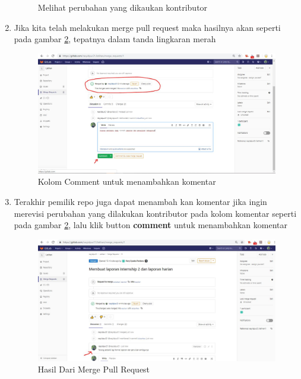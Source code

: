 \begin{enumerate}
\begin{figure}[!htbp]
\caption{Melihat perubahan yang dikaukan kontributor}
\label{fig:pr9}
\end{figure}
\item Jika kita telah melakukan merge pull request maka hasilnya akan seperti pada gambar \ref{fig:pr10}, tepatnya dalam tanda lingkaran merah 
\subitem
\begin{figure}[!htbp]
\centerline{\includegraphics[width=.75\textwidth]{Figures/gitlab/pr10.JPG}}
\caption{Kolom Comment untuk menambahkan komentar}
\label{fig:pr10}
\end{figure}
\item Terakhir pemilik repo juga dapat menambah kan komentar jika ingin merevisi perubahan yang dilakukan kontributor pada kolom komentar seperti pada gambar \ref{fig:pr10}, lalu klik button \textbf{comment} untuk menambahkan komentar
\subitem
\begin{figure}[!htbp]
\centerline{\includegraphics[width=.75\textwidth]{Figures/gitlab/pr11.JPG}}
\caption{Hasil Dari Merge Pull Request}
\label{fig:pr11}
\end{figure}
\end{enumerate}
